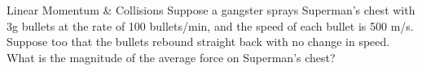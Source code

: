 \begin{frame}{Linear Momentum \& Collisions}
\small
Suppose a gangster sprays Superman's chest with 3g bullets at the rate of 100 bullets/min, and the speed of each bullet is 500 m/s. Suppose too that the bullets rebound straight back with no change in speed. What is the magnitude of the average force on Superman's chest?
\vspace{10cm}
\end{frame}





